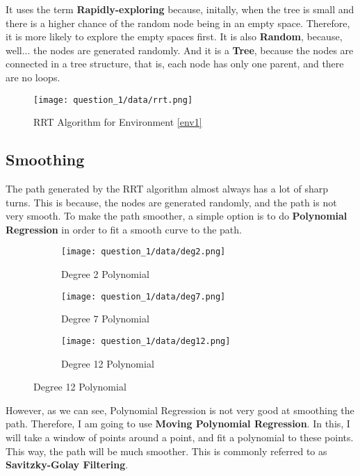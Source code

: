 \documentclass[12pt]{report}
\begin{document}
It uses the term \textbf{Rapidly-exploring} because, initally, when the tree is small and there is a higher chance of the random node being in an empty space. Therefore, it is more likely to explore the empty spaces first. It is also \textbf{Random}, because, well... the nodes are generated randomly. And it is a \textbf{Tree}, because the nodes are connected in a tree structure, that is, each node has only one parent, and there are no loops.

\begin{figure}[H]
    \centering
    \texttt{[image: question\_1/data/rrt.png]}
    \caption{RRT Algorithm for Environment \ref{env1}}
\end{figure}

\subsection{Smoothing}

The path generated by the RRT algorithm almost always has a lot of sharp turns. This is because, the nodes are generated randomly, and the path is not very smooth. To make the path smoother, a simple option is to do \textbf{Polynomial Regression} in order to fit a smooth curve to the path.

\begin{figure}[H]
    \centering
    \begin{subfigure}{0.3\textwidth}
        \texttt{[image: question\_1/data/deg2.png]}
        \caption{Degree 2 Polynomial}
    \end{subfigure}
    \begin{subfigure}{0.3\textwidth}
        \texttt{[image: question\_1/data/deg7.png]}
        \caption{Degree 7 Polynomial}
    \end{subfigure}
    \begin{subfigure}{0.3\textwidth}
        \texttt{[image: question\_1/data/deg12.png]}
        \caption{Degree 12 Polynomial}
    \end{subfigure}
\end{figure}

However, as we can see, Polynomial Regression is not very good at smoothing the path. Therefore, I am going to use \textbf{Moving Polynomial Regression}. In this, I will take a window of points around a point, and fit a polynomial to these points. This way, the path will be much smoother. This is commonly referred to as \textbf{Savitzky-Golay Filtering}.
\end{document}
